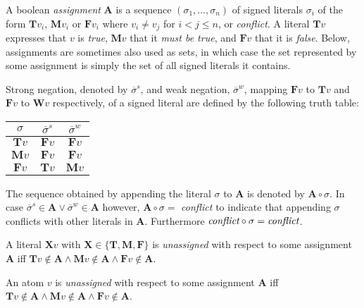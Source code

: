 \documentclass{vutinfth} %
\newcommand{\negstrong}[1]{\overline{#1}^s}
\newcommand{\negweak}[1]{\overline{#1}^w}
\begin{document}
A boolean \emph{assignment} $\mathbf{A}$ is a sequence $(\sigma_1, \ldots, \sigma_n)$ of signed literals $\sigma_i$ of the form $\mathbf{T}v_i$, $\mathbf{M}v_i$ or $\mathbf{F}v_i$ where $v_i \not = v_j$ for $i < j \leq n$, or \emph{conflict}.
A literal $\mathbf{T}v$ expresses that $v$ is \emph{true}, $\mathbf{M}v$ that it \emph{must be true}, and $\mathbf{F}v$ that it is \emph{false}. Below, assignments are sometimes also used as sets, in which case the set represented by some assignment is simply the set of all signed literals it contains.

Strong negation, denoted by $\negstrong{\sigma}$, and weak negation, $\negweak{\sigma}$, mapping $\mathbf{F}v$ to $\mathbf{T}v$ and $\mathbf{F}v$ to $\mathbf{W}v$ respectively, of a signed literal are defined by the following truth table:%

\begin{center}
\begin{tabular}{|c|cc|}
\hline
$\sigma$&$\negstrong{\sigma}$&$\negweak{\sigma}$\\
\hline
\hline
$\mathbf{T}v$&$\mathbf{F}v$&$\mathbf{F}v$\\
$\mathbf{M}v$&$\mathbf{F}v$&$\mathbf{F}v$\\
$\mathbf{F}v$&$\mathbf{T}v$&$\mathbf{M}v$\\
\hline
\end{tabular}
\end{center}

The sequence obtained by appending the literal $\sigma$ to $\mathbf{A}$ is denoted by $\mathbf{A} \circ \sigma$. In case $\negstrong{\sigma} \in \mathbf{A} \vee \negweak{\sigma} \in \mathbf{A}$ however, $\mathbf{A} \circ \sigma =$ \emph{conflict} to indicate that appending $\sigma$ conflicts with other literals in $\mathbf{A}$. Furthermore $\emph{conflict} \circ \sigma = \emph{conflict}$.

A literal $\mathbf{X}v$ with $\mathbf{X} \in \{ \mathbf{T}, \mathbf{M}, \mathbf{F} \}$ is \emph{unassigned} with respect to some assignment $\mathbf{A}$ iff $\mathbf{T}v \not \in \mathbf{A} \wedge \mathbf{M}v \not \in \mathbf{A} \wedge \mathbf{F}v \not \in \mathbf{A}$.

An atom $v$ is \emph{unassigned} with respect to some assignment $\mathbf{A}$ iff $\mathbf{T}v \not \in \mathbf{A} \wedge \mathbf{M}v \not \in \mathbf{A} \wedge \mathbf{F}v \not \in \mathbf{A}$.
\end{document}

